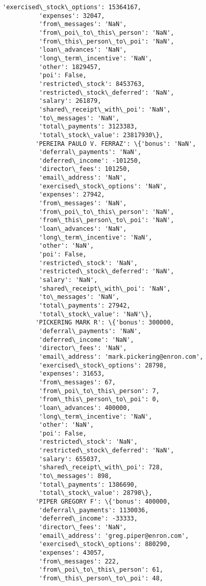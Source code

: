 \documentclass[11pt]{article}
\begin{document}
\begin{Verbatim}[commandchars=\\\{\}]
          'exercised\_stock\_options': 15364167,
          'expenses': 32047,
          'from\_messages': 'NaN',
          'from\_poi\_to\_this\_person': 'NaN',
          'from\_this\_person\_to\_poi': 'NaN',
          'loan\_advances': 'NaN',
          'long\_term\_incentive': 'NaN',
          'other': 1829457,
          'poi': False,
          'restricted\_stock': 8453763,
          'restricted\_stock\_deferred': 'NaN',
          'salary': 261879,
          'shared\_receipt\_with\_poi': 'NaN',
          'to\_messages': 'NaN',
          'total\_payments': 3123383,
          'total\_stock\_value': 23817930\},
         'PEREIRA PAULO V. FERRAZ': \{'bonus': 'NaN',
          'deferral\_payments': 'NaN',
          'deferred\_income': -101250,
          'director\_fees': 101250,
          'email\_address': 'NaN',
          'exercised\_stock\_options': 'NaN',
          'expenses': 27942,
          'from\_messages': 'NaN',
          'from\_poi\_to\_this\_person': 'NaN',
          'from\_this\_person\_to\_poi': 'NaN',
          'loan\_advances': 'NaN',
          'long\_term\_incentive': 'NaN',
          'other': 'NaN',
          'poi': False,
          'restricted\_stock': 'NaN',
          'restricted\_stock\_deferred': 'NaN',
          'salary': 'NaN',
          'shared\_receipt\_with\_poi': 'NaN',
          'to\_messages': 'NaN',
          'total\_payments': 27942,
          'total\_stock\_value': 'NaN'\},
         'PICKERING MARK R': \{'bonus': 300000,
          'deferral\_payments': 'NaN',
          'deferred\_income': 'NaN',
          'director\_fees': 'NaN',
          'email\_address': 'mark.pickering@enron.com',
          'exercised\_stock\_options': 28798,
          'expenses': 31653,
          'from\_messages': 67,
          'from\_poi\_to\_this\_person': 7,
          'from\_this\_person\_to\_poi': 0,
          'loan\_advances': 400000,
          'long\_term\_incentive': 'NaN',
          'other': 'NaN',
          'poi': False,
          'restricted\_stock': 'NaN',
          'restricted\_stock\_deferred': 'NaN',
          'salary': 655037,
          'shared\_receipt\_with\_poi': 728,
          'to\_messages': 898,
          'total\_payments': 1386690,
          'total\_stock\_value': 28798\},
         'PIPER GREGORY F': \{'bonus': 400000,
          'deferral\_payments': 1130036,
          'deferred\_income': -33333,
          'director\_fees': 'NaN',
          'email\_address': 'greg.piper@enron.com',
          'exercised\_stock\_options': 880290,
          'expenses': 43057,
          'from\_messages': 222,
          'from\_poi\_to\_this\_person': 61,
          'from\_this\_person\_to\_poi': 48,

\end{Verbatim}
\end{document}
